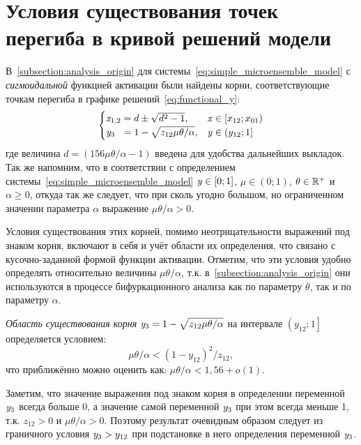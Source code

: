 
\section{Условия существования точек перегиба в кривой решений модели}  \label{appendix:origin_roots_existance}

В~\autoref{subsection:analysis_origin} для системы~\eqref{eq:simple_microensemble_model} с \textit{сигмоидальной} функцией активации были найдены корни, соответствующие точкам перегиба в графике решений~\eqref{eq:functional_y}:
\begin{equation}
    \nonumber
    \begin{cases}
        \mathit{x}_{1,2} = d \pm \sqrt{d^{2} - 1},                              & \mathit{x} \in \left[x_{12}; x_{01}\right) \\
        \mathit{y}_{3\phantom{,4}}   = 1 - \sqrt{z_{12} \mu \theta / \alpha},   & \mathit{y} \in \left(y_{12}; 1\right] \\
    \end{cases}
\end{equation}
где величина $d = \left( 156 \mu \theta / \alpha - 1\right)$ введена для удобства дальнейших выкладок. Так же напомним, что в соответствии с определением системы~\eqref{eq:simple_microensemble_model} $\mathit{y} \in [0;1]$, $\mu \in (0;1)$, $\theta \in \mathbb{R}^{+}$ и $\alpha \ge 0$, откуда так же следует, что при сколь угодно большом, но ограниченном значении параметра $\alpha$ выражение $\mu \theta / \alpha > 0$.

Условия существования этих корней, помимо неотрицательности выражений под знаком корня, включают в себя и учёт области их определения, что связано с кусочно-заданной формой функции активации. Отметим, что эти условия удобно определять относительно величины $\mu \theta / \alpha$, т.к. в~\autoref{subsection:analysis_origin} они используются в процессе бифуркационного анализа как по параметру $\theta$, так и по параметру $\alpha$. 

\begin{Statement*}
    \textit{Область существования корня} $\mathit{y}_{3} = 1 - \sqrt{z_{12} \mu \theta / \alpha}$ на интервале $\left(y_{12}; 1\right]$ определяется условием: $$ \mu \theta / \alpha < \left(1 - y_{12}\right)^{2} / z_{12}, $$ что приближённо можно оценить как: $\mu \theta / \alpha < 1,56 + o(1)$.
\end{Statement*}
\begin{Proof}
    Заметим, что значение выражения под знаком корня в определении переменной $\mathit{y}_{3}$ всегда больше 0, а значение самой переменной $\mathit{y}_{3}$ при этом всегда меньше 1, т.к. $z_{12} > 0$ и $\mu \theta / \alpha > 0$. Поэтому результат очевидным образом следует из граничного условия $\mathit{y}_{3} > y_{12}$ при подстановке в него определения переменной $\mathit{y}_{3}$.
\end{Proof}

